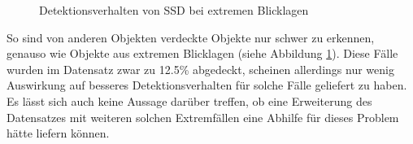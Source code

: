 \begin{figure}[H]
	\centering
	\hspace{2cm}
	\caption{Detektionsverhalten von SSD bei extremen Blicklagen}
	\label{lagen}
\end{figure}

So sind von anderen Objekten verdeckte Objekte nur schwer zu erkennen, genauso wie Objekte aus extremen Blicklagen (siehe Abbildung \ref{lagen}). Diese Fälle wurden im Datensatz zwar zu 12.5\% abgedeckt, scheinen allerdings nur wenig Auswirkung auf besseres Detektionsverhalten für solche Fälle geliefert zu haben. Es lässt sich auch keine Aussage darüber treffen, ob eine Erweiterung des Datensatzes mit weiteren solchen Extremfällen eine Abhilfe für dieses Problem hätte liefern können. 

